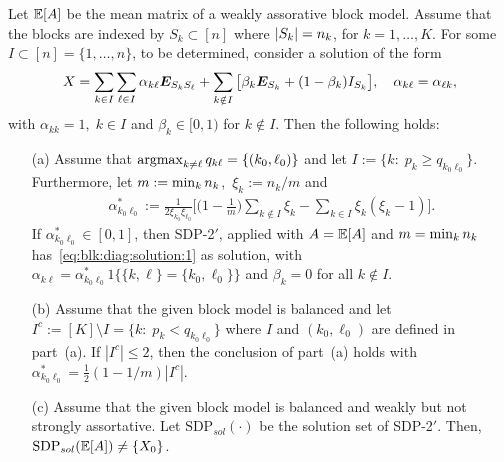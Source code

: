 \begin{prop}\label{prop:failure:SDP-2}
	Let $\mathbb{E}[A]$ be the mean matrix of a weakly assorative block model. Assume that the blocks are indexed by $S_k \subset [n]$ where $|S_k| = n_k$, for $k=1,\dots,K$.   For some $I \subset [n]  = \{1, \dots, n\}$, to be determined, consider a solution of the form
	\begin{align}\label{eq:blk:diag:solution:1}
		X = \sum_{k \in I} \sum_{\ell \in I} \alpha_{k \ell} \bm{E}_{S_k S_\ell}
		+ \sum_{ k \notin I} \big[ \beta_k \bm{E}_{S_k} +  (1-\beta_k) I_{S_k} \big], \quad \alpha_{k \ell} = \alpha_{\ell k},
	\end{align} 
	with $\alpha_{kk} = 1, \; k \in I$ and $\beta_k \in [0,1)$ for $k \notin I$. 
	Then the following holds:
	\begin{itemize}\itemsep=1.5ex
		\item[(a)]  Assume that $\operatorname*{argmax}_{k \neq \ell} q_{k\ell} = \{(k_0,\ell_0)\}$ and let $I := \{ k:\; p_k \ge q_{k_0 \ell_0}\}$. Furthermore, let $m := \min_k n_k$,~$\xi_k := n_k/m$ and
		\begin{align}\label{eq:alpha:k0:ell0}
			\alpha^*_{k_0 \ell_0} := \frac{1}{2 \xi_{k_0} \xi_{\ell_0}} \Big[
			\Big(1- \frac1m\Big) \sum_{k \notin I} \xi_k - \sum_{k \in I} \xi_k(\xi_k-1) \Big].
		\end{align}
		If $\alpha^*_{k_0 \ell_0} \in [0,1]$, then SDP-2$'$, applied with $A = \mathbb{E}[A]$ and $m = \min_k n_k$ has~\eqref{eq:blk:diag:solution:1} as solution,  with $\alpha_{k \ell} = \alpha_{k_0 \ell_0}^* 1\{ \{k,\ell\} = \{k_0,\ell_0\}\}$ and $\beta_k = 0$ for all $k \notin I$.

		
		\item[(b)] Assume that the given block model is balanced and let $I^c := [K] \setminus I = \{ k:\; p_k < q_{k_0 \ell_0}\}$ where $I$ and $(k_0,\ell_0)$ are defined in part~(a). If $|I^c| \le 2$, then the conclusion of part~(a) holds with $\alpha^*_{k_0 \ell_0} = \frac12(1-1/m) | I^c|$.


		\item[(c)] Assume that the given block model is balanced and weakly but not strongly assortative. Let $\text{SDP}_{sol}(\cdot)$ be the solution set of SDP-2$'$. Then, $\text{SDP}_{sol}(\mathbb{E} [A]) \neq \{X_0\}$.

	\end{itemize}
\end{prop}


